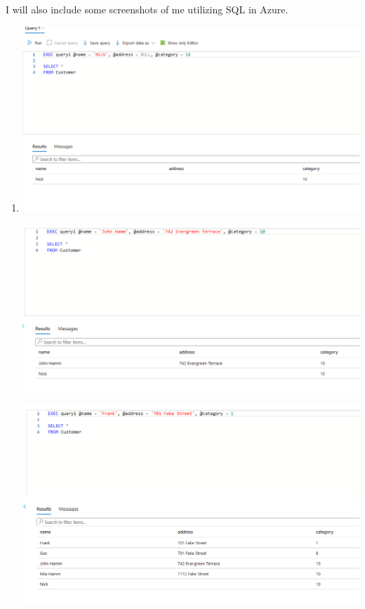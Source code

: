 \documentclass[11pt]{article}
\begin{document}
I will also include some screenshots of me utilizing SQL in Azure.
\begin{enumerate}
\item 
\includegraphics[width = \textwidth]{insertCust1.png}

\includegraphics[width = \textwidth]{insertCust2.png}

\includegraphics[width = \textwidth]{insertCust3.png}


\end{enumerate}
\end{document}
